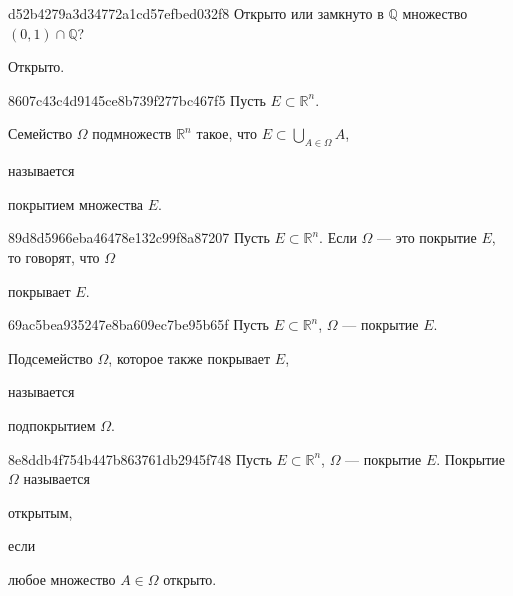 \begin{note}{d52b4279a3d34772a1cd57efbed032f8}
    Открыто или замкнуто в \({ \mathbb Q }\) множество \({ (0, 1) \cap \mathbb Q }\)?

    \begin{cloze}{1}
        Открыто.
    \end{cloze}
\end{note}

\begin{note}{8607c43c4d9145ce8b739f277bc467f5}
    Пусть \({ E \subset \mathbb R^{n} }\).
    \begin{icloze}{1}Семейство \({ \Omega }\) подмножеств \({ \mathbb R^{n} }\) такое, что \({ E \subset \bigcup_{A \in \Omega}^{} A }\),\end{icloze} называется \begin{icloze}{2}покрытием множества \({ E }\).\end{icloze}
\end{note}

\begin{note}{89d8d5966eba46478e132c99f8a87207}
    Пусть \({ E \subset \mathbb R^{n} }\).
    Если \({ \Omega }\) --- это покрытие \({ E }\), то говорят, что \({ \Omega }\) \begin{icloze}{1}покрывает \({ E }\).\end{icloze}
\end{note}

\begin{note}{69ac5bea935247e8ba609ec7be95b65f}
    Пусть \({ E \subset \mathbb R^{n} }\),\: \({ \Omega }\) --- покрытие \({ E }\).
    \begin{icloze}{1}Подсемейство \({ \Omega }\), которое также покрывает \({ E }\),\end{icloze} называется \begin{icloze}{2}подпокрытием \({ \Omega }\).\end{icloze}
\end{note}

\begin{note}{8e8ddb4f754b447b863761db2945f748}
    Пусть \({ E \subset \mathbb R^{n} }\),\: \({ \Omega }\) --- покрытие \({ E }\).
    Покрытие \({ \Omega }\) называется \begin{icloze}{2}открытым,\end{icloze} если \begin{icloze}{1}любое множество \({ A \in \Omega }\) открыто.\end{icloze}
\end{note}

